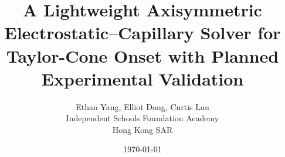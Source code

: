 \documentclass[11pt]{article}
\title{\textbf{A Lightweight Axisymmetric Electrostatic--Capillary Solver for Taylor-Cone Onset with Planned Experimental Validation}}
\author{Ethan Yang, Elliot Dong, Curtis Lau\\
Independent Schools Foundation Academy\\
Hong Kong SAR}
\date{\today}
\begin{document}
\maketitle

\begin{abstract}

\end{abstract}

\tableofcontents
\newpage














\newpage



\appendix


\end{document}
